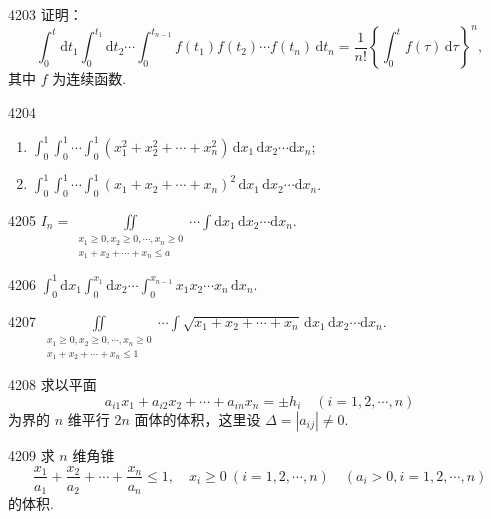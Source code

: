 \begin{prob}[M]{4203}
证明：
\[
\int_0^t \mathrm{d}t_1 \int_0^{t_1} \mathrm{d}t_2 \cdots \int_0^{t_{n-1}} f(t_1) f(t_2) \cdots f(t_n)\,\mathrm{d}t_n = \frac{1}{n!} \left\{ \int_0^t f(\tau)\,\mathrm{d}\tau \right\}^n,
\]
其中 $f$ 为连续函数.
\end{prob}


\begin{prob}[M]{4204}
\begin{enumerate}[label=(\alph*), itemsep=2pt, topsep=3pt]
  \item $\displaystyle \int_0^1 \int_0^1 \cdots \int_0^1 (x_1^2 + x_2^2 + \cdots + x_n^2)\,\mathrm{d}x_1\,\mathrm{d}x_2 \cdots \mathrm{d}x_n$;
  \item $\displaystyle \int_0^1 \int_0^1 \cdots \int_0^1 (x_1 + x_2 + \cdots + x_n)^2\,\mathrm{d}x_1\,\mathrm{d}x_2 \cdots \mathrm{d}x_n$.
\end{enumerate}
\end{prob}

\begin{prob}[S]{4205}
$\displaystyle I_n = \iint\limits_{\substack{x_1\geqslant 0, x_2\geqslant 0, \cdots, x_n\geqslant 0 \\ x_1+x_2+\cdots+x_n\leqslant a}} \cdots \int \mathrm{d}x_1\,\mathrm{d}x_2 \cdots \mathrm{d}x_n$.
\end{prob}

\begin{prob}[S]{4206}
$\displaystyle \int_0^1 \mathrm{d}x_1 \int_0^{x_1} \mathrm{d}x_2 \cdots \int_0^{x_{n-1}} x_1 x_2 \cdots x_n\,\mathrm{d}x_n$.
\end{prob}

\begin{prob}[S]{4207}
$\displaystyle \iint\limits_{\substack{x_1\geqslant 0, x_2\geqslant 0, \cdots, x_n\geqslant 0 \\ x_1+x_2+\cdots+x_n\leqslant 1}} \cdots \int \sqrt{x_1+x_2+\cdots+x_n}\,\mathrm{d}x_1\,\mathrm{d}x_2 \cdots \mathrm{d}x_n$.
\end{prob}

\begin{prob}[M]{4208}
求以平面
\[
a_{i1} x_1 + a_{i2} x_2 + \cdots + a_{in} x_n = \pm h_i \quad (i = 1, 2, \cdots, n)
\]
为界的 $n$ 维平行 $2n$ 面体的体积，这里设 $\Delta = |a_{ij}| \neq 0$.
\end{prob}

\begin{prob}[M]{4209}
求 $n$ 维角锥
\[
\frac{x_1}{a_1} + \frac{x_2}{a_2} + \cdots + \frac{x_n}{a_n} \leqslant 1, \quad x_i \geqslant 0 \ (i = 1, 2, \cdots, n) \quad (a_i > 0, i = 1, 2, \cdots, n)
\]
的体积.
\end{prob}

